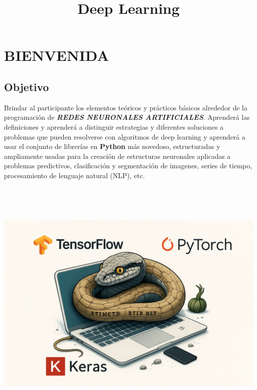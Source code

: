 \documentclass[
]{book}
\title{Deep Learning}
\author{}
\date{\vspace{-2.5em}}
\begin{document}
\maketitle

{
\setcounter{tocdepth}{1}
\tableofcontents
}
\hypertarget{bienvenida}{%
\chapter*{BIENVENIDA}\label{bienvenida}}

\hypertarget{objetivo}{%
\section*{Objetivo}\label{objetivo}}

Brindar al participante los elementos teóricos y prácticos básicos alrededor de la programación de \emph{\textbf{REDES NEURONALES ARTIFICIALES}}. Aprenderá las definiciones y aprenderá a distinguir estrategias y diferentes soluciones a problemas que pueden resolverse con algoritmos de deep learning y aprenderá a usar el conjunto de librerías en \textbf{Python} más novedoso, estructuradas y ampliamente usadas para la creación de estructuras neuronales aplicadas a problemas predictivos, clasificación y segmentación de imagenes, series de tiempo, procesamiento de lenguaje natural (NLP), etc.

\begin{center}\includegraphics[width=600pt,height=350pt]{img/00-presentacion/MIT-Python-TF} \end{center}
\end{document}
